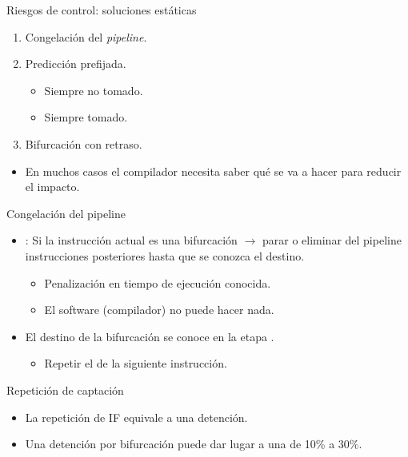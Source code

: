 \begin{frame}[t]{Riesgos de control: soluciones estáticas}
\begin{enumerate}
  \item Congelación del \emph{pipeline}.
  \item Predicción prefijada.
    \begin{itemize}
      \item Siempre no tomado.
      \item Siempre tomado.
    \end{itemize}
  \item Bifurcación con retraso.
\end{enumerate}
\begin{itemize}
  \item En muchos casos el compilador necesita saber qué se va a hacer para reducir el impacto.
\end{itemize}
\end{frame}

\begin{frame}[t]{Congelación del pipeline}
\begin{itemize}
  \item {}: Si la instrucción actual es una bifurcación 
        $\rightarrow$ parar o eliminar del pipeline instrucciones posteriores 
        hasta que se conozca el destino.
    \begin{itemize}
      \item Penalización en tiempo de ejecución conocida.
      \item El software (compilador) no puede hacer nada.
    \end{itemize}

    \item El destino de la bifurcación se conoce en la etapa .
      \begin{itemize}
        \item Repetir el  de la siguiente instrucción.
      \end{itemize}
\end{itemize}
\end{frame}

\begin{frame}[t]{Repetición de captación}
\makebox[\textwidth][c]{

}

\begin{itemize}
  \item La repetición de IF equivale a una detención.
  \item Una detención por bifurcación puede dar lugar a una  de 10\% a 30\%.
\end{itemize}
\end{frame}

